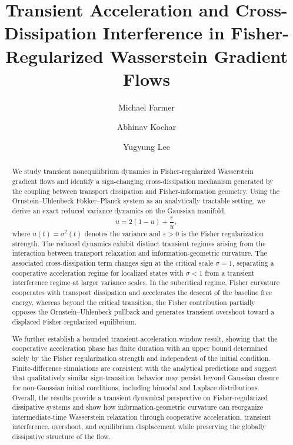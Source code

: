 \documentclass[aps,prl,twocolumn,10pt,superscriptaddress]{revtex4-2}
\begin{document}
\title{Transient Acceleration and Cross-Dissipation Interference in Fisher-Regularized Wasserstein Gradient Flows}

\author{Michael Farmer}
\author{Abhinav Kochar}
\author{Yugyung Lee}




\begin{abstract}
We study transient nonequilibrium dynamics in Fisher-regularized Wasserstein gradient flows and identify a sign-changing cross-dissipation mechanism generated by the coupling between transport dissipation and Fisher-information geometry. Using the Ornstein--Uhlenbeck Fokker--Planck system as an analytically tractable setting, we derive an exact reduced variance dynamics on the Gaussian manifold,
\[
\dot{u}
=
2(1-u)
+
\frac{\varepsilon}{u},
\]
where \(u(t)=\sigma^2(t)\) denotes the variance and \(\varepsilon>0\) is the Fisher regularization strength. The reduced dynamics exhibit distinct transient regimes arising from the interaction between transport relaxation and information-geometric curvature. The associated cross-dissipation term changes sign at the critical scale \(\sigma=1\), separating a cooperative acceleration regime for localized states with \(\sigma<1\) from a transient interference regime at larger variance scales. In the subcritical regime, Fisher curvature cooperates with transport dissipation and accelerates the descent of the baseline free energy, whereas beyond the critical transition, the Fisher contribution partially opposes the Ornstein--Uhlenbeck pullback and generates transient overshoot toward a displaced Fisher-regularized equilibrium.

We further establish a bounded transient-acceleration-window result, showing that the cooperative acceleration phase has finite duration with an upper bound determined solely by the Fisher regularization strength and independent of the initial condition. Finite-difference simulations are consistent with the analytical predictions and suggest that qualitatively similar sign-transition behavior may persist beyond Gaussian closure for non-Gaussian initial conditions, including bimodal and Laplace distributions. Overall, the results provide a transient dynamical perspective on Fisher-regularized dissipative systems and show how information-geometric curvature can reorganize intermediate-time Wasserstein relaxation through cooperative acceleration, transient interference, overshoot, and equilibrium displacement while preserving the globally dissipative structure of the flow.
\end{abstract}
\end{document}
